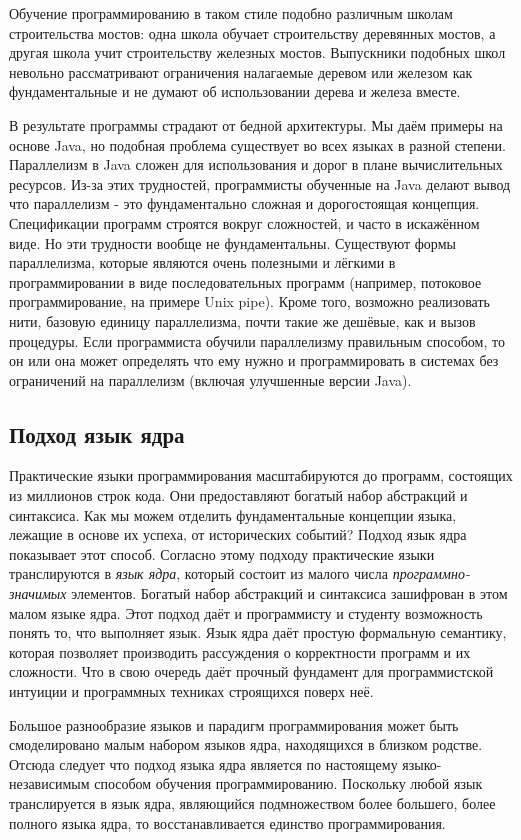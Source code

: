 Обучение программированию в таком стиле подобно различным школам строительства мостов: одна школа обучает строительству деревянных мостов, а другая школа учит строительству железных мостов. Выпускники подобных школ невольно рассматривают ограничения налагаемые деревом или железом как фундаментальные и не думают об использовании дерева и железа вместе.

В результате программы страдают от бедной архитектуры. Мы даём примеры на основе Java, но подобная проблема существует во всех языках в разной степени. Параллелизм в Java сложен для использования и дорог в плане вычислительных ресурсов. Из-за этих трудностей, программисты обученные на Java делают вывод что параллелизм - это фундаментально сложная и дорогостоящая концепция. Спецификации программ строятся вокруг сложностей, и часто в искажённом виде. Но эти трудности вообще не фундаментальны. Существуют формы параллелизма, которые являются очень полезными и лёгкими в программировании в виде последовательных программ (например, потоковое программирование, на примере Unix pipe). Кроме того, возможно реализовать нити, базовую единицу параллелизма, почти такие же дешёвые, как и вызов процедуры. Если программиста обучили параллелизму правильным способом, то он или она может определять что ему нужно и программировать в системах без ограничений на параллелизм (включая улучшенные версии Java).

\subsection*{Подход язык ядра}

Практические языки программирования масштабируются до программ, состоящих из миллионов строк кода. Они предоставляют богатый набор абстракций и синтаксиса. Как мы можем отделить фундаментальные концепции языка, лежащие в основе их успеха, от исторических событий? Подход язык ядра показывает этот способ. Согласно этому подходу практические языки транслируются в \emph{язык ядра}, который состоит из малого числа \emph{программно-значимых} элементов. Богатый набор абстракций и синтаксиса зашифрован в этом малом языке ядра. Этот подход даёт и программисту и студенту возможность понять то, что выполняет язык. Язык ядра даёт простую формальную семантику, которая позволяет производить рассуждения о корректности программ и их сложности. Что в свою очередь даёт прочный фундамент для программистской интуиции и программных техниках строящихся поверх неё.

Большое разнообразие языков и парадигм программирования может быть смоделировано малым набором языков ядра, находящихся в близком родстве. Отсюда следует что подход языка ядра является по настоящему языко-независимым способом обучения программированию. Поскольку любой язык транслируется в язык ядра, являющийся подмножеством более большего, более полного языка ядра, то восстанавливается единство программирования.

